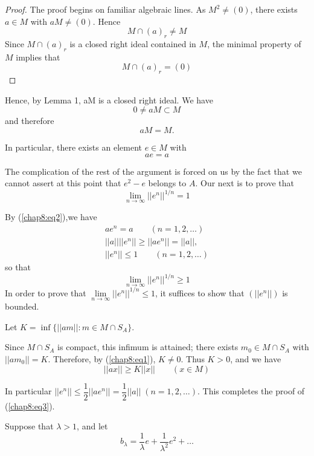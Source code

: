 \begin{proof}
  The proof begins on familiar algebraic lines. As $M^2 \neq (0)$,
  there exists $a \in M$ with $a M \neq (0)$. Hence  
  $$
  M \cap (a)_r \neq M
  $$
  Since $M \cap (a)_r$ is a closed right ideal contained in $M$, the
  minimal property of $M$ implies that  
  \begin{equation*}
    M \cap (a)_r = (0) \tag{1}\label{chap8:eq1}
  \end{equation*}
\end{proof}

Hence, by Lemma 1, aM is a closed right ideal. We have 
$$
0 \neq aM \subset M
$$
and therefore 
$$
aM =M.
$$

In particular, there exists an element $e \in M$ with 
\begin{equation*}
  ae = a \tag{2}\label{chap8:eq2}
\end{equation*}

The complication of the rest of the argument is forced on us by the
fact that we cannot assert at this point that $e^2 - e$ belongs to
$A$. Our next is to prove that  
\begin{equation*}
  \lim_{n \to \infty} || e^n ||^{1/n} = 1 \tag{3}\label{chap8:eq3}
\end{equation*}

By (\ref{chap8:eq2}),\pageoriginale we have 
\begin{gather*}
  ae^n = a \qquad (n = 1, 2, \ldots)\\
  || a || ||e^n|| \geq || ae^n || = || a ||,\\
  || e^n || \leq 1 \qquad (n= 1, 2, \ldots )
\end{gather*}
so that 
$$
\lim_{n \to \infty} || e^{n}||^{1/ n} \geq 1
$$
In order to prove that $\lim \limits_{n \to \infty} || e^{n}||^{1/ n}
\leq 1$, it suffices to show that $(||e^n||)$ is bounded. 

Let $K = \inf \{ ||am||: m \in M \cap S_A \}$.

Since $M \cap S_A$ is compact, this infimum is attained; there exists
$m_0 \in M \cap S_A$ with $||am_0|| = K$. Therefore, by
(\ref{chap8:eq1}), $K \neq 0$. Thus $K > 0$, and we have  
$$
|| ax || \geq K|| x || \qquad ( x \in M)
$$

In particular $|| e^n || \leq \dfrac{1}{2}|| ae^n || = \dfrac{1}{2}
||a|| \; (n=1,2, \ldots)$. This completes the proof of
(\ref{chap8:eq3}).  

Suppose that $\lambda > 1$, and let 
$$
b_{\lambda} = \frac{1}{\lambda} e+ \frac{1}{\lambda^2} e^2 + \ldots
$$


